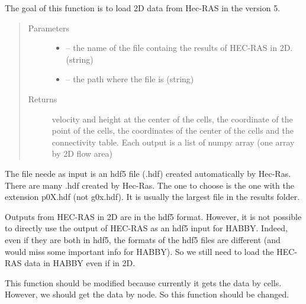 \documentclass[letterpaper,10pt,english]{sphinxmanual}
\begin{document}
\begin{fulllineitems}
\label{\detokenize{index:src.hec_ras2D.load_hec_ras2d}}
The goal of this function is to load 2D data from Hec-RAS in the version 5.
\begin{quote}\begin{description}
\item[{Parameters}] \leavevmode\begin{itemize}
\item {} 
 -- the name of the file containg the results of HEC-RAS in 2D. (string)

\item {} 
 -- the path where the file is (string)

\end{itemize}

\item[{Returns}] \leavevmode
velocity and height at the center of the cells, the coordinate of the point of the cells,
the coordinates of the center of the cells and the connectivity table. Each output is a list of numpy array
(one array by 2D flow area)

\end{description}\end{quote}


The file neede as input is an hdf5 file (.hdf) created automatically by Hec-Ras. There are many .hdf created by
Hec-Ras. The one to choose is the one with the extension p0X.hdf (not g0x.hdf). It is usually the largest file in
the results folder.


Outputs from HEC-RAS in 2D are in the hdf5 format. However, it is not possible to directly use the output of HEC-RAS
as an hdf5 input for HABBY. Indeed, even if they are both in hdf5, the formats of the hdf5 files are different
(and would miss some important info for HABBY).  So we still need to load the HEC-RAS data in HABBY even if in 2D.

This function should be modified because currently it gets the data by cells. However, we should get the
data by node. So this function should be changed.



\end{fulllineitems}
\end{document}
